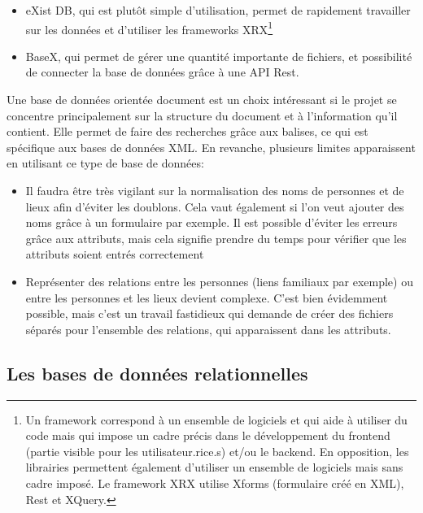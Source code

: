 \begin{itemize}
    \item eXist DB, qui est plutôt simple d’utilisation, permet de rapidement travailler sur les données et d’utiliser les frameworks XRX\footnote{Un framework correspond à un ensemble de logiciels et qui aide à utiliser du code mais qui impose un cadre précis dans le développement du frontend (partie visible pour les utilisateur.rice.s) et/ou le backend. En opposition, les librairies permettent également d’utiliser un ensemble de logiciels mais sans cadre imposé. Le framework XRX utilise Xforms (formulaire créé en XML), Rest et XQuery.}
    \item BaseX, qui permet de gérer une quantité importante de fichiers, et possibilité de connecter la base de données grâce à une API Rest.\\
    
\end{itemize}

\noindent Une base de données orientée document est un choix intéressant si le projet se concentre principalement sur la structure du document et à l’information qu’il contient. Elle permet de faire des recherches grâce aux balises, ce qui est spécifique aux bases de données XML. En revanche, plusieurs limites apparaissent en utilisant ce type de base de données:\\ 

\begin{itemize}
    \item Il faudra être très vigilant sur la normalisation des noms de personnes et de lieux afin d’éviter les doublons. Cela vaut également si l’on veut ajouter des noms grâce à un formulaire par exemple. Il est possible d’éviter les erreurs grâce aux attributs, mais cela signifie prendre du temps pour vérifier que les attributs soient entrés correctement
    \item Représenter des relations entre les personnes (liens familiaux par exemple) ou entre les personnes et les lieux devient complexe. C’est bien évidemment possible, mais c’est un travail fastidieux qui demande de créer des fichiers séparés pour l’ensemble des relations, qui apparaissent dans les attributs.
\end{itemize}
    
    \subsection{Les bases de données relationnelles}

